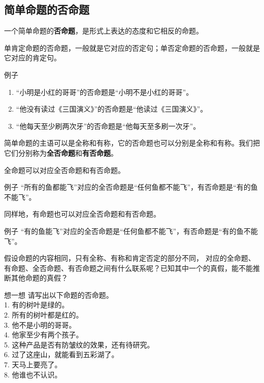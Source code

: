 \documentclass[12pt,UTF8,a4paper]{article}
\begin{document}
\subsection{简单命题的否命题}

一个简单命题的\textbf{否命题}，是形式上表达的态度和它相反的命题。

单肯定命题的否命题，一般就是它对应的否定句；单否定命题的否命题，一般就是它对应的肯定句。

\begin{blockin}{例子}
    \begin{enumerate}
        \item “小明是小红的哥哥”的否命题是“小明不是小红的哥哥”。
        \item “他没有读过《三国演义》”的否命题是“他读过《三国演义》”。
        \item “他每天至少刷两次牙”的否命题是“他每天至多刷一次牙”。
    \end{enumerate}
\end{blockin}

简单命题的主语可以是全称和有称，它的否命题也可以分别是全称和有称。我们把它们分别称为\textbf{全否命题}和\textbf{有否命题}。

全命题可以对应全否命题和有否命题。

\begin{blockin}{例子}
    “所有的鱼都能飞”对应的全否命题是“任何鱼都不能飞”，有否命题是“有的鱼不能飞”。
\end{blockin}

同样地，有命题也可以对应全否命题和有否命题。

\begin{blockin}{例子}
    “有的鱼能飞”对应的全否命题是“任何鱼都不能飞”，有否命题是“有的鱼不能飞”。
\end{blockin}

假设命题的内容相同，只有全称、有称和肯定否定的部分不同，
对应的全命题、有命题、全否命题、有否命题之间有什么联系呢？已知其中一个的真假，能不能推断其他命题的真假？

\begin{blockaft}{想一想}
    请写出以下命题的否命题。\\
    1. 有的树叶是绿的。 \\
    2. 所有的树叶都是红的。\\
    3. 他不是小明的哥哥。\\
    4. 他家至少有两个孩子。 \\
    5. 这种产品是否有防皱纹的效果，还有待研究。\\
    6. 过了这座山，就能看到五彩湖了。\\
    7. 天马上要亮了。 \\
    8. 他谁也不认识。
\end{blockaft}
\end{document}
